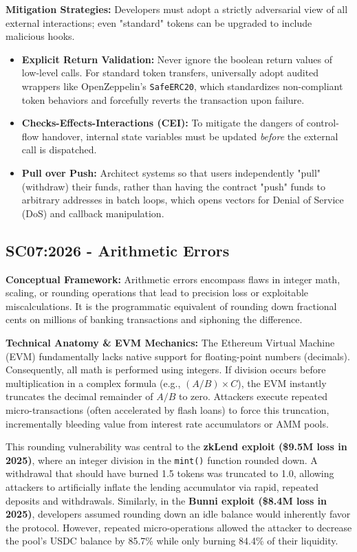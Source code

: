 \textbf{Mitigation Strategies:} Developers must adopt a strictly adversarial view of all external interactions; even "standard" tokens can be upgraded to include malicious hooks.
\begin{itemize}
    \item \textbf{Explicit Return Validation:} Never ignore the boolean return values of low-level calls. For standard token transfers, universally adopt audited wrappers like OpenZeppelin's \texttt{SafeERC20}, which standardizes non-compliant token behaviors and forcefully reverts the transaction upon failure.
    \item \textbf{Checks-Effects-Interactions (CEI):} To mitigate the dangers of control-flow handover, internal state variables must be updated \textit{before} the external call is dispatched.
    \item \textbf{Pull over Push:} Architect systems so that users independently "pull" (withdraw) their funds, rather than having the contract "push" funds to arbitrary addresses in batch loops, which opens vectors for Denial of Service (DoS) and callback manipulation.
\end{itemize}

\subsection{SC07:2026 - Arithmetic Errors}
\textbf{Conceptual Framework:} Arithmetic errors encompass flaws in integer math, scaling, or rounding operations that lead to precision loss or exploitable miscalculations. It is the programmatic equivalent of rounding down fractional cents on millions of banking transactions and siphoning the difference.

\textbf{Technical Anatomy \& EVM Mechanics:} The Ethereum Virtual Machine (EVM) fundamentally lacks native support for floating-point numbers (decimals). Consequently, all math is performed using integers. If division occurs before multiplication in a complex formula (e.g., $(A / B) \times C$), the EVM instantly truncates the decimal remainder of $A / B$ to zero. Attackers execute repeated micro-transactions (often accelerated by flash loans) to force this truncation, incrementally bleeding value from interest rate accumulators or AMM pools. 

This rounding vulnerability was central to the \textbf{zkLend exploit (\$9.5M loss in 2025)}, where an integer division in the \texttt{mint()} function rounded down. A withdrawal that should have burned 1.5 tokens was truncated to 1.0, allowing attackers to artificially inflate the lending accumulator via rapid, repeated deposits and withdrawals. Similarly, in the \textbf{Bunni exploit (\$8.4M loss in 2025)}, developers assumed rounding down an idle balance would inherently favor the protocol. However, repeated micro-operations allowed the attacker to decrease the pool's USDC balance by 85.7\% while only burning 84.4\% of their liquidity.

